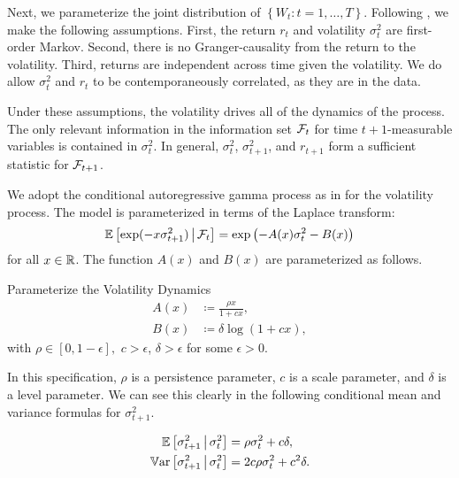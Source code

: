 \documentclass[11pt, letterpaper, twoside]{article}
\begin{document}
Next, we parameterize the joint distribution of $\left\lbrace W_t:t=1,\ldots, T\right\rbrace $. 
Following \textcite{han2018leverage}, we make the following assumptions. First, the return $r_t$ and volatility $\sigma^2_t$ are first-order Markov. Second, there is no Granger-causality from the return to the volatility. Third, returns are independent across time given the volatility. We do allow $\sigma^2_{t}$ and $r_{t}$ to be contemporaneously correlated, as they are in the data. 

Under these assumptions, the volatility drives all of the dynamics of the process. The only relevant information in the information set $\mathcal{F}_{t}$ for time $t+1$-measurable variables is contained in $\sigma^2_t$. In general, $\sigma^2_t$, $\sigma^2_{t+1}$, and $r_{t+1}$ form a sufficient statistic for $\mathcal{F}_{t+1}$. 

We adopt the conditional autoregressive gamma process as in \textcite{gourieroux2006autoregressive, han2018leverage} for the volatility process. The model is parameterized in terms of the Laplace transform: 
%
\begin{equation}
    \operatorname{\mathbb{E}}\left[\exp(-x \sigma^2_{t+1}) \,\middle\vert\, \mathcal{F}_{t}\right] = \exp\left(- A(x) \sigma^2_{t} - B(x)\right)
    \label{eqn:vol_laplace_transform}
\end{equation}
%
for all $x \in \mathbb{R}$. The function $A(x)$ and $B(x)$ are parameterized as follows.

\begin{defn}{Parameterize the Volatility Dynamics}
     \label{defn:physical_vol_dynamics}
     \begin{align}
        \label{defn:a_PP}
        A(x) &\coloneqq \frac{\rho x}{1 + c x}, \\
        \label{defn:b_PP}
        B(x) &\coloneqq \delta \log(1 + c x),
     \end{align}
with $\rho \in [0,1-\epsilon],$ $c > \epsilon$, $\delta > \epsilon$ for some $\epsilon > 0$.
\end{defn}

In this specification, $\rho$ is a persistence parameter, $c$ is a scale parameter, and $\delta$ is a level parameter. We can see this clearly in the following conditional mean and variance formulas for $\sigma^2_{t+1}$.

\begin{remark} 
 \label{remark:vol_moment_conditions}
    \begin{align}
        \E\left[\sigma^2_{t+1} \mvert \sigma^2_t \right] &= \rho \sigma^2_t + c \delta,\\
%   
        \Var\left[\sigma^2_{t+1} \mvert \sigma^2_t \right] &= 2 c \rho \sigma^2_t + c^2 \delta.
%   
    \end{align}
\end{remark}
\end{document}
